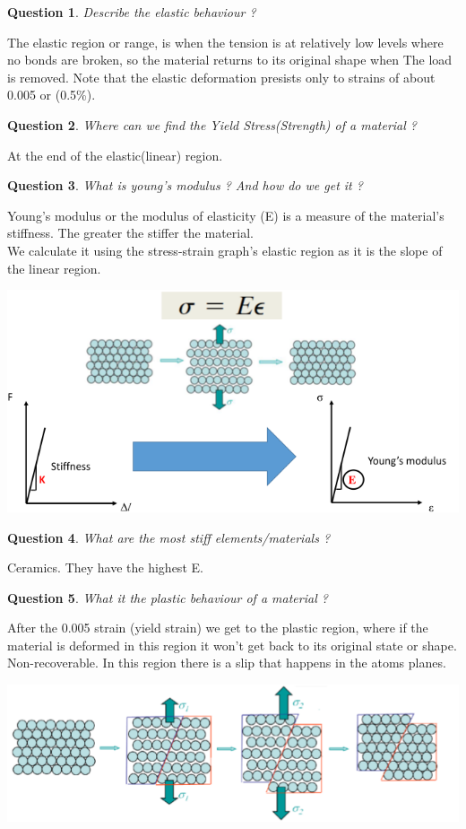 \documentclass[13]{article}
\newtheorem{exer}{Question}
\begin{document}
\begin{exer}
Describe the elastic behaviour ?
\end{exer}
The elastic region or range, is when the tension is at relatively low levels where no bonds are broken, so the material returns to its original shape when The load is removed. Note that the elastic deformation presists only to strains of about 0.005 or (0.5\%).
\begin{exer}
	Where can we find the Yield Stress(Strength) of a material ?
\end{exer}
At the end of the elastic(linear) region.
\begin{exer}
What is young's modulus ? And how do we get it ?
\end{exer}
Young's modulus or the modulus of elasticity (E) is a measure of the material's stiffness. The greater the stiffer the material. \\
We calculate it using the stress-strain graph's elastic region as it is the slope of the linear region. 
\begin{center}
\includegraphics[scale=0.5]{figures/2.png}
\end{center}
\begin{exer}
What are the most stiff elements/materials ?
\end{exer}
Ceramics. They have the highest E.
\begin{exer}
What it the plastic behaviour of a material ?
\end{exer}
After the 0.005 strain (yield strain)  we get to the plastic region, where if the material is deformed in this region it won't get back to its original state or shape. Non-recoverable. In this region there is a slip that happens in the atoms planes.
\begin{center}
\includegraphics[scale=0.5]{figures/3.png}
\end{center}
\end{document}
